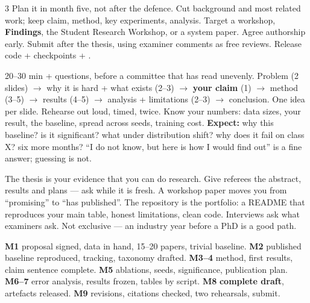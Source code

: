 \documentclass[10pt,a4paper]{article}
\begin{document}
\begin{multicols}{3}
Plan it in month five, not after the defence. Cut background and most related
work; keep claim, method, key experiments, analysis. Target a workshop,
\textbf{Findings}, the Student Research Workshop, or a system paper. Agree
authorship early. Submit after the thesis, using examiner comments as free
reviews. Release code + checkpoints + .

20--30 min + questions, before a committee that has read unevenly. Problem
(2 slides) $\to$ why it is hard + what exists (2--3) $\to$ \textbf{your claim}
(1) $\to$ method (3--5) $\to$ results (4--5) $\to$ analysis + limitations
(2--3) $\to$ conclusion. One idea per slide. Rehearse out loud, timed, twice.
Know your numbers: data sizes, your result, the baseline, spread across seeds,
training cost. \textbf{Expect:} why this baseline? is it significant? what
under distribution shift? why does it fail on class X? six more months?
``I do not know, but here is how I would find out'' is a fine answer; guessing
is not.

The thesis is your evidence that you can do research.
Give referees the abstract, results and plans --- ask while it is fresh. A
workshop paper moves you from ``promising'' to ``has published''.
The repository is the portfolio: a README that reproduces your main
table, honest limitations, clean code. Interviews ask what examiners ask.
Not exclusive --- an industry year before a PhD is a good path.

\textbf{M1} proposal signed, data in hand, 15--20 papers, trivial baseline.
\textbf{M2} published baseline reproduced, tracking, taxonomy drafted.
\textbf{M3--4} method, first results, claim sentence complete.
\textbf{M5} ablations, seeds, significance, publication plan.
\textbf{M6--7} error analysis, results frozen, tables by script.
\textbf{M8} \textbf{complete draft}, artefacts released.
\textbf{M9} revisions, citations checked, two rehearsals, submit.

\end{multicols}
\end{document}
